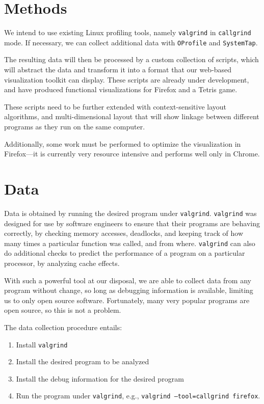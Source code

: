 \documentclass[12pt]{article}
\begin{document}
\section{Methods}
We intend to use existing Linux profiling tools, namely
\texttt{valgrind} in \texttt{callgrind} mode. If necessary, we can
collect additional data with \texttt{OProfile} and \texttt{SystemTap}.

The resulting data will then be processed by a custom collection of
scripts, which will abstract the data and transform it into a format
that our web-based visualization toolkit can display.  These scripts
are already under development, and have produced functional
visualizations for Firefox and a Tetris game.

These scripts need to be further extended with context-sensitive
layout algorithms, and multi-dimensional layout that will show linkage
between different programs as they run on the same computer.

Additionally, some work must be performed to optimize the
visualization in Firefox---it is currently very resource intensive and
performs well only in Chrome.

\section{Data}
Data is obtained by running the desired program under
\texttt{valgrind}. \texttt{valgrind} was designed for use by software
engineers to ensure that their programs are behaving correctly, by
checking memory accesses, deadlocks, and keeping track of how many
times a particular function was called, and from where.
\texttt{valgrind} can also do additional checks to predict the
performance of a program on a particular processor, by analyzing cache
effects.

With such a powerful tool at our disposal, we are able to collect data
from any program without change, so long as debugging information is
available, limiting us to only open source software.  Fortunately,
many very popular programs are open source, so this is not a problem.

The data collection procedure entails:
\begin{enumerate}
\item Install \texttt{valgrind}
\item Install the desired program to be analyzed
\item Install the debug information for the desired program
\item Run the program under \texttt{valgrind}, e.g., \texttt{valgrind
    --tool=callgrind firefox}.
\end{enumerate}
\end{document}
